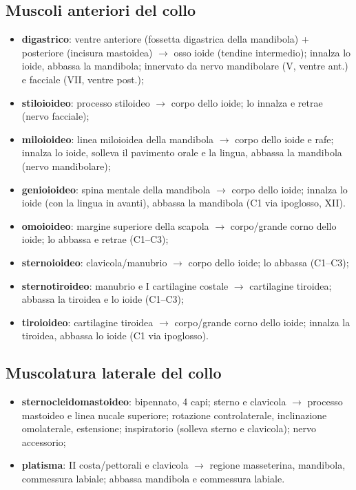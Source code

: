 \subsection{Muscoli anteriori del collo}
\begin{itemize}
  \item \textbf{digastrico}: ventre anteriore (fossetta digastrica della mandibola) + posteriore
    (incisura mastoidea) $\rightarrow$ osso ioide (tendine intermedio); innalza lo ioide, abbassa la
    mandibola; innervato da nervo mandibolare (V, ventre ant.) e facciale (VII, ventre post.);
  \item \textbf{stiloioideo}: processo stiloideo $\rightarrow$ corpo dello ioide; lo innalza e
    retrae (nervo facciale);
  \item \textbf{miloioideo}: linea miloioidea della mandibola $\rightarrow$ corpo dello ioide e rafe;
    innalza lo ioide, solleva il pavimento orale e la lingua, abbassa la mandibola (nervo
    mandibolare);
  \item \textbf{genioioideo}: spina mentale della mandibola $\rightarrow$ corpo dello ioide; innalza
    lo ioide (con la lingua in avanti), abbassa la mandibola (C1 via ipoglosso, XII).
\end{itemize}
\begin{itemize}
  \item \textbf{omoioideo}: margine superiore della scapola $\rightarrow$ corpo/grande corno dello
    ioide; lo abbassa e retrae (C1--C3);
  \item \textbf{sternoioideo}: clavicola/manubrio $\rightarrow$ corpo dello ioide; lo abbassa
    (C1--C3);
  \item \textbf{sternotiroideo}: manubrio e I cartilagine costale $\rightarrow$ cartilagine tiroidea;
    abbassa la tiroidea e lo ioide (C1--C3);
  \item \textbf{tiroioideo}: cartilagine tiroidea $\rightarrow$ corpo/grande corno dello ioide;
    innalza la tiroidea, abbassa lo ioide (C1 via ipoglosso).
\end{itemize}

\subsection{Muscolatura laterale del collo}
\begin{itemize}
  \item \textbf{sternocleidomastoideo}: bipennato, 4 capi; sterno e clavicola $\rightarrow$ processo
    mastoideo e linea nucale superiore; rotazione controlaterale, inclinazione omolaterale,
    estensione; inspiratorio (solleva sterno e clavicola); nervo accessorio;
  \item \textbf{platisma}: II costa/pettorali e clavicola $\rightarrow$ regione masseterina,
    mandibola, commessura labiale; abbassa mandibola e commessura labiale.
\end{itemize}


